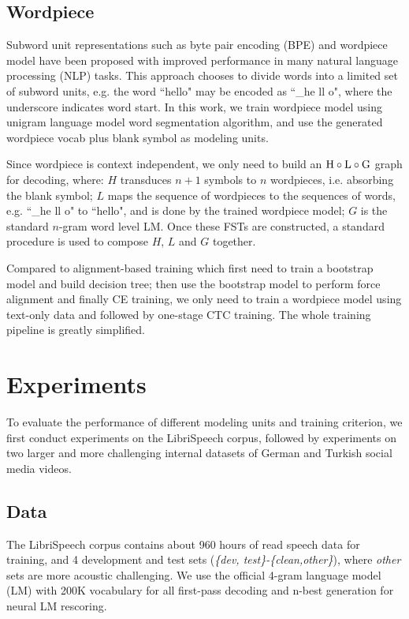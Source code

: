 \documentclass[a4paper]{article}
\begin{document}
\subsection{Wordpiece}
\label{sec:wordpiece}

Subword unit representations such as byte pair encoding (BPE)\cite{sennrich2016neural} and wordpiece model\cite{WuSCLNMKCGMKSJL16} have been proposed with improved performance in many natural language processing (NLP) tasks. This approach chooses to divide words into a limited set of subword units, e.g. the word ``hello" may be encoded as ``\_he ll o", where the underscore indicates word start. In this work, we train wordpiece model using unigram language model word segmentation algorithm\cite{kudo2018subword}, and use the generated wordpiece vocab plus blank symbol as modeling units.

Since wordpiece is context independent, we only need to build an $\rm{H \circ L \circ G}$ graph for decoding, where: $H$ transduces $n+1$ symbols to $n$ wordpieces, i.e. absorbing the blank symbol; $L$ maps the sequence of wordpieces to the sequences of words, e.g. ``\_he ll o" to ``hello", and is done by the trained wordpiece model; $G$ is the standard $n$-gram word level LM. Once these FSTs are constructed, a standard procedure is used to compose $H$, $L$ and $G$ together. 

Compared to alignment-based training which first need to train a bootstrap model and build decision tree; then use the bootstrap model to perform force alignment and finally CE training, we only need to train a wordpiece model using text-only data and followed by one-stage CTC training. The whole training pipeline is greatly simplified.

\section{Experiments}
\label{sec:exp}
To evaluate the performance of different modeling units and training criterion, we first conduct experiments on the LibriSpeech corpus\cite{panayotov2015librispeech}, followed by experiments on two larger and more challenging internal datasets of German and Turkish social media videos.

\subsection{Data}
\label{sec:dataset}
The LibriSpeech corpus contains about 960 hours of read speech data for training, and 4 development and test sets (\emph{\{dev, test\}-\{clean,other\}}), where \emph{other} sets are more acoustic challenging. We use the official 4-gram language model (LM) with 200K vocabulary for all first-pass decoding and n-best generation for neural LM rescoring. 
\end{document}
